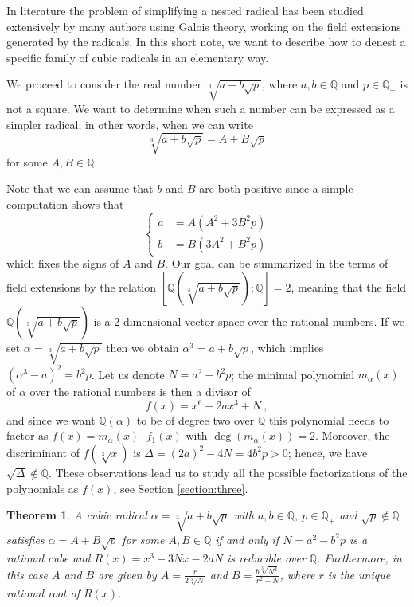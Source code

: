 \documentclass[11pt,a4paper]{article}
\numberwithin{equation}{section}
\newcommand{\Q}{\mathbb{Q}}
\newtheorem{teo}{Theorem}[section]
\theoremstyle{definition}
\begin{document}
In literature the problem of simplifying a nested radical has been studied extensively by many authors \cite{BFHT,Landau,Zippel} using Galois theory, working on the field extensions generated by the radicals. In this short note, we want to describe how to denest a specific family of cubic radicals in an elementary way.

We proceed to consider the real number $\sqrt[3]{a+b\sqrt p}$, where $a,b\in\Q$ and $p\in\Q_+$ is not a square. We want to determine when such a number can be expressed as a simpler radical; in other words, when we can write \begin{equation}
 \sqrt[3]{a+b\sqrt p}=A+B\sqrt p   
 \label{eq:1}
\end{equation} for some $A,B\in\Q$. 

Note that we can assume that $b$ and $B$ are both positive since a simple computation shows that 
\begin{equation}
 \left\{\begin{aligned}
    a&=A(A^2+3B^2p) \\
    b&=B(3A^2+B^2p)
 \end{aligned}\right.   
 \label{eq:relation}
\end{equation} which fixes the signs of $A$ and $B$. Our goal can be summarized in the terms of field extensions by the relation $[\Q(\sqrt[3]{a+b\sqrt p}):\Q]=2$, meaning that the field $\Q(\sqrt[3]{a+b\sqrt p})$ is a 2-dimensional vector space over the rational numbers.
If we set $\alpha=\sqrt[3]{a+b\sqrt p}$ then we obtain $\alpha^3=a+b\sqrt p$, which implies $(\alpha^3-a)^2=b^2p$. Let us denote $N=a^2-b^2p$; the minimal polynomial $m_\alpha(x)$ of $\alpha$ over the rational numbers is then a divisor of \[f(x)=x^6-2ax^3+N\:,\] and since we want $\Q(\alpha)$ to be of degree two over $\Q$ this polynomial needs to factor as $f(x)=m_\alpha(x)\cdot f_1(x)$ with $\deg(m_\alpha(x))=2$. Moreover, the discriminant of $f(\sqrt[3] x)$ is $\Delta=(2a)^2-4N=4b^2p>0$; hence, we have $\sqrt\Delta\notin\Q$. These observations lead us to study all the possible factorizations of the polynomials as $f(x)$, see Section \ref{section:three}.
\begin{teo}
    \label{teo:main}
 A cubic radical $\alpha=\sqrt[3]{a+b\sqrt p}$ with $a,b\in\Q,\:p\in\Q_+$ and $\sqrt p\notin\Q$ satisfies $\alpha=A+B\sqrt p$ for some $A,B\in\Q$ if and only if $N=a^2-b^2p$ is a rational cube and $R(x)=x^3-3Nx-2aN$ is reducible over $\Q$. 
 Furthermore, in this case $A$ and $B$ are given by $A=\frac{r}{2\sqrt[3]{N}}$ and $B=\frac{b\sqrt[3]{N^2}}{r^2-N}$, where $r$ is the unique rational root of $R(x)$.    
\end{teo}
\end{document}
